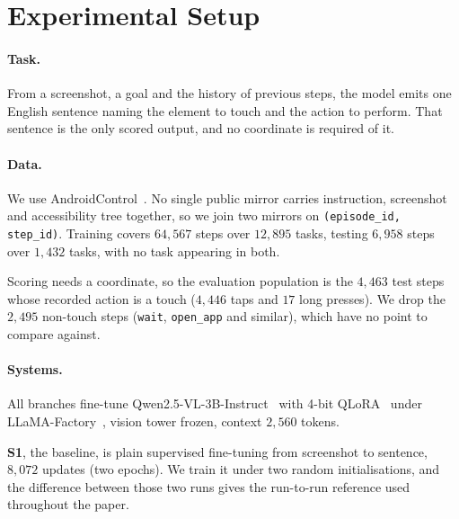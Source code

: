 \documentclass[runningheads,a4paper]{llncs}
\begin{document}
\section{Experimental Setup}
\label{sec:setup}

\paragraph{Task.}
From a screenshot, a goal and the history of previous steps, the model emits one English sentence
naming the element to touch and the action to perform. That sentence is the only scored output, and no
coordinate is required of it.

\paragraph{Data.}
We use AndroidControl~\cite{androidcontrol}. No single public mirror carries instruction,
screenshot and accessibility tree together, so we join two mirrors on
\texttt{(episode\_id, step\_id)}. Training covers $64{,}567$ steps over $12{,}895$ tasks, testing $6{,}958$ steps
over $1{,}432$ tasks, with no task appearing in both.

Scoring needs a coordinate, so the evaluation population is the $4{,}463$ test steps whose
recorded action is a touch ($4{,}446$ taps and $17$ long presses). We drop the $2{,}495$
non-touch steps (\texttt{wait}, \texttt{open\_app} and similar), which have no point to compare
against.

\paragraph{Systems.}
All branches fine-tune Qwen2.5-VL-3B-Instruct~\cite{qwen25vl} with 4-bit
QLoRA~\cite{lora,qlora} under LLaMA-Factory~\cite{llamafactory}, vision tower frozen, context
$2{,}560$ tokens.

\textbf{S1}, the baseline, is plain supervised fine-tuning from screenshot to sentence,
$8{,}072$ updates (two epochs). We train it under two random initialisations, and the
difference between those two runs gives the run-to-run reference used throughout the paper.
\end{document}
